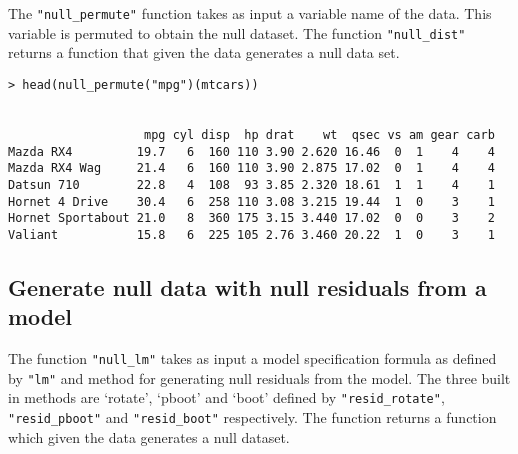 The \texttt{"null\_permute"} function takes as input a variable name of
the data. This variable is permuted to obtain the null dataset. The
function \texttt{"null\_dist"} returns a function that given the data
generates a null data set.

\begin{verbatim}
> head(null_permute("mpg")(mtcars))


                   mpg cyl disp  hp drat    wt  qsec vs am gear carb
Mazda RX4         19.7   6  160 110 3.90 2.620 16.46  0  1    4    4
Mazda RX4 Wag     21.4   6  160 110 3.90 2.875 17.02  0  1    4    4
Datsun 710        22.8   4  108  93 3.85 2.320 18.61  1  1    4    1
Hornet 4 Drive    30.4   6  258 110 3.08 3.215 19.44  1  0    3    1
Hornet Sportabout 21.0   8  360 175 3.15 3.440 17.02  0  0    3    2
Valiant           15.8   6  225 105 2.76 3.460 20.22  1  0    3    1
\end{verbatim}

%

\subsection{Generate null data with null residuals from a
model}\label{generate-null-data-with-null-residuals-from-a-model}

The function \texttt{"null\_lm"} takes as input a model specification
formula as defined by \texttt{"lm"} and method for generating null
residuals from the model. The three built in methods are `rotate',
`pboot' and `boot' defined by \texttt{"resid\_rotate"},
\texttt{"resid\_pboot"} and \texttt{"resid\_boot"} respectively. The
function returns a function which given the data generates a null
dataset.


